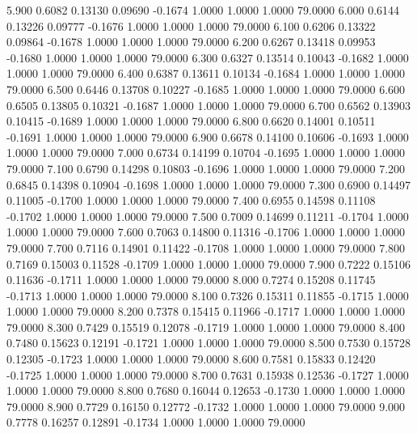    5.900   0.6082   0.13130   0.09690  -0.1674   1.0000   1.0000   1.0000  79.0000
   6.000   0.6144   0.13226   0.09777  -0.1676   1.0000   1.0000   1.0000  79.0000
   6.100   0.6206   0.13322   0.09864  -0.1678   1.0000   1.0000   1.0000  79.0000
   6.200   0.6267   0.13418   0.09953  -0.1680   1.0000   1.0000   1.0000  79.0000
   6.300   0.6327   0.13514   0.10043  -0.1682   1.0000   1.0000   1.0000  79.0000
   6.400   0.6387   0.13611   0.10134  -0.1684   1.0000   1.0000   1.0000  79.0000
   6.500   0.6446   0.13708   0.10227  -0.1685   1.0000   1.0000   1.0000  79.0000
   6.600   0.6505   0.13805   0.10321  -0.1687   1.0000   1.0000   1.0000  79.0000
   6.700   0.6562   0.13903   0.10415  -0.1689   1.0000   1.0000   1.0000  79.0000
   6.800   0.6620   0.14001   0.10511  -0.1691   1.0000   1.0000   1.0000  79.0000
   6.900   0.6678   0.14100   0.10606  -0.1693   1.0000   1.0000   1.0000  79.0000
   7.000   0.6734   0.14199   0.10704  -0.1695   1.0000   1.0000   1.0000  79.0000
   7.100   0.6790   0.14298   0.10803  -0.1696   1.0000   1.0000   1.0000  79.0000
   7.200   0.6845   0.14398   0.10904  -0.1698   1.0000   1.0000   1.0000  79.0000
   7.300   0.6900   0.14497   0.11005  -0.1700   1.0000   1.0000   1.0000  79.0000
   7.400   0.6955   0.14598   0.11108  -0.1702   1.0000   1.0000   1.0000  79.0000
   7.500   0.7009   0.14699   0.11211  -0.1704   1.0000   1.0000   1.0000  79.0000
   7.600   0.7063   0.14800   0.11316  -0.1706   1.0000   1.0000   1.0000  79.0000
   7.700   0.7116   0.14901   0.11422  -0.1708   1.0000   1.0000   1.0000  79.0000
   7.800   0.7169   0.15003   0.11528  -0.1709   1.0000   1.0000   1.0000  79.0000
   7.900   0.7222   0.15106   0.11636  -0.1711   1.0000   1.0000   1.0000  79.0000
   8.000   0.7274   0.15208   0.11745  -0.1713   1.0000   1.0000   1.0000  79.0000
   8.100   0.7326   0.15311   0.11855  -0.1715   1.0000   1.0000   1.0000  79.0000
   8.200   0.7378   0.15415   0.11966  -0.1717   1.0000   1.0000   1.0000  79.0000
   8.300   0.7429   0.15519   0.12078  -0.1719   1.0000   1.0000   1.0000  79.0000
   8.400   0.7480   0.15623   0.12191  -0.1721   1.0000   1.0000   1.0000  79.0000
   8.500   0.7530   0.15728   0.12305  -0.1723   1.0000   1.0000   1.0000  79.0000
   8.600   0.7581   0.15833   0.12420  -0.1725   1.0000   1.0000   1.0000  79.0000
   8.700   0.7631   0.15938   0.12536  -0.1727   1.0000   1.0000   1.0000  79.0000
   8.800   0.7680   0.16044   0.12653  -0.1730   1.0000   1.0000   1.0000  79.0000
   8.900   0.7729   0.16150   0.12772  -0.1732   1.0000   1.0000   1.0000  79.0000
   9.000   0.7778   0.16257   0.12891  -0.1734   1.0000   1.0000   1.0000  79.0000
